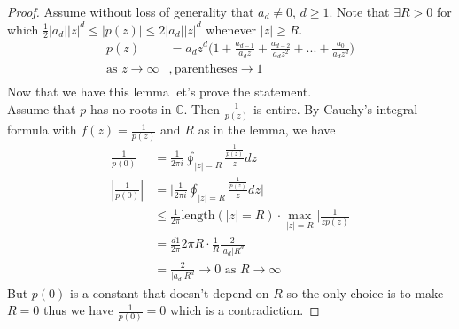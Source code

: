 \documentclass[a4paper, 11pt]{article}
\begin{document}
	\begin{proof}
		Assume without loss of generality that $a_d \neq 0$, $d\geq 1$. Note that $\exists R>0$ for which $\frac{1}{2}|a_d||z|^d \leq |p(z)| \leq 2|a_d||z|^d$ whenever $|z|\geq R$. 
			\begin{align*}
				p(z) &= a_dz^d\Big(1 + \frac{a_{d-1}}{a_dz}+\frac{a_{d-2}}{a_dz^2}+ ... + \frac{a_0}{a_dz^d}\Big) \\ 
				\text{as } z\rightarrow \infty&, \text{parentheses} \rightarrow 1 \\ 
			\end{align*} 
		Now that we have this lemma let's prove the statement. \\ 
		
		\noindent Assume that $p$ has no roots in $\mathbb{C}$. Then $\frac{1}{p(z)}$ is entire. By Cauchy's integral formula with $f(z) = \frac{1}{p(z)}$ and $R$ as in the lemma, we have
			\begin{align*}
				\frac{1}{p(0)} &= \frac{1}{2\pi i}\oint_{|z|=R}\frac{\frac{1}{p(z)}}{z}dz \\ 
				|\frac{1}{p(0)}| &= \Big|\frac{1}{2\pi i}\oint_{|z|=R}\frac{\frac{1}{p(z)}}{z}dz\Big| \\ 
					&\leq \frac{1}{2\pi}\text{length}(|z|=R)\cdot\max_{|z|=R}|\frac{1}{zp(z)} \\ 
					&= \frac{d1}{2\pi}2\pi R\cdot \frac{1}{R} \frac{2}{|a_d|R^d} \\ 
					&= \frac{2}{|a_d|R^d} \rightarrow 0 \text{ as } R \rightarrow \infty
			\end{align*}
			But $p(0)$ is a constant that doesn't depend on $R$ so the only choice is to make $R=0$ thus we have $\frac{1}{p(0)} = 0$ which is a contradiction. 
	\end{proof}
	
\end{document}
